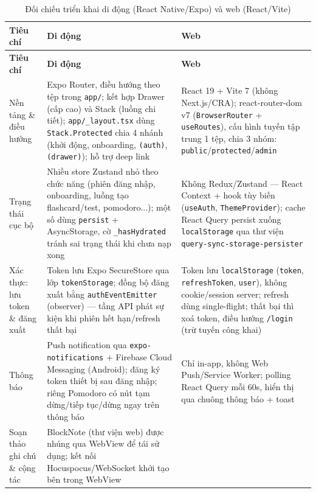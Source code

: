 \begin{singlespace}
\begin{longtable}{|>{\raggedright\arraybackslash}p{2.6cm}|>{\raggedright\arraybackslash}p{6.2cm}|>{\raggedright\arraybackslash}p{6.2cm}|}
\caption{Đối chiếu triển khai di động (React Native/Expo) và web (React/Vite)}
\label{tab:mobile-web-comparison} \\
\hline
\textbf{Tiêu chí} & \textbf{Di động} & \textbf{Web} \\
\hline
\endfirsthead
\hline
\textbf{Tiêu chí} & \textbf{Di động} & \textbf{Web} \\
\hline
\endhead
Nền tảng \& điều hướng &
Expo Router, điều hướng theo tệp trong \texttt{app/}; kết hợp Drawer (cấp cao) và Stack (luồng chi tiết); \texttt{app/\_layout.tsx} dùng \texttt{Stack.Protected} chia 4 nhánh (khởi động, onboarding, \texttt{(auth)}, \texttt{(drawer)}); hỗ trợ deep link &
React 19 + Vite 7 (không Next.js/CRA); react-router-dom v7 (\texttt{BrowserRouter} + \texttt{useRoutes}), cấu hình tuyến tập trung 1 tệp, chia 3 nhóm: \texttt{public}/\texttt{protected}/\texttt{admin} \\
\hline
Trạng thái cục bộ &
Nhiều store Zustand nhỏ theo chức năng (phiên đăng nhập, onboarding, luồng tạo flashcard/test, pomodoro...); một số dùng \texttt{persist} + AsyncStorage, cờ \texttt{\_hasHydrated} tránh sai trạng thái khi chưa nạp xong &
Không Redux/Zustand — React Context + hook tùy biến (\texttt{useAuth}, \texttt{ThemeProvider}); cache React Query persist xuống \texttt{localStorage} qua thư viện \texttt{query-sync-storage-\allowbreak persister} \\
\hline
Xác thực: lưu token \& đăng xuất &
Token lưu Expo SecureStore qua lớp \texttt{tokenStorage}; đồng bộ đăng xuất bằng \texttt{authEventEmitter} (observer) — tầng API phát sự kiện khi phiên hết hạn/refresh thất bại &
Token lưu \texttt{localStorage} (\texttt{token}, \texttt{refreshToken}, \texttt{user}), không cookie/session server; refresh dùng single-flight; thất bại thì xoá token, điều hướng \texttt{/login} (trừ tuyến công khai) \\
\hline
Thông báo &
Push notification qua \texttt{expo-notifications} + Firebase Cloud Messaging (Android); đăng ký token thiết bị sau đăng nhập; riêng Pomodoro có nút tạm dừng/tiếp tục/dừng ngay trên thông báo &
Chỉ in-app, không Web Push/Service Worker; polling React Query mỗi 60s, hiển thị qua chuông thông báo + toast \\
\hline
Soạn thảo ghi chú \& cộng tác &
BlockNote (thư viện web) được nhúng qua WebView để tái sử dụng; kết nối Hocuspocus/WebSocket khởi tạo bên trong WebView &

\end{longtable}
\end{singlespace}
